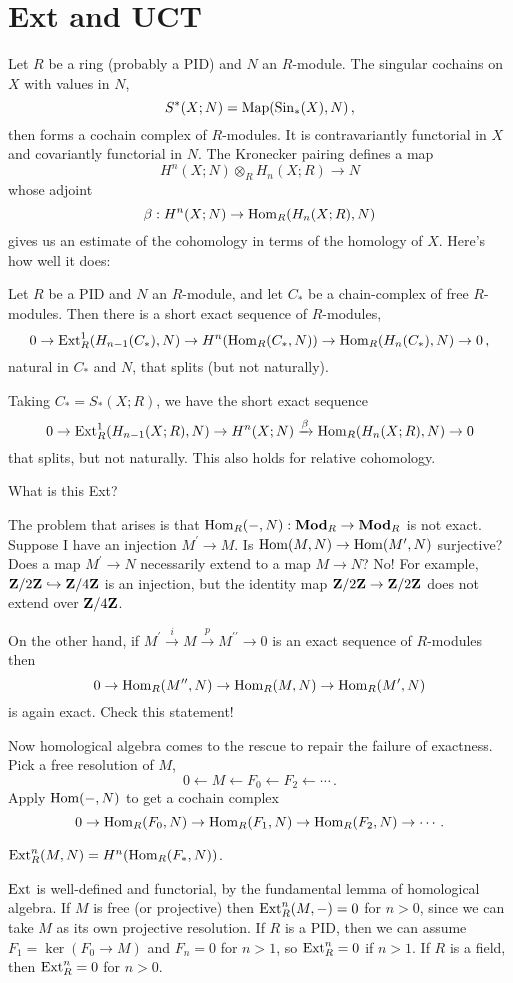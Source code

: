 \section{Ext and UCT}
Let $R$ be a ring (probably a PID) and $N$ an $R$-module. The singular cochains
on $X$ with values in $N$, 
\[S^\ast(X;N)=\operatorname{Map}(\mathrm{Sin}_\ast(X),N)\,,
\]
then forms a cochain complex of $R$-modules. It is contravariantly functorial
in $X$ and covariantly functorial in $N$. The Kronecker pairing defines a map
\[
H^n(X;N)\otimes_R H_n(X;R)\to N
\]
whose adjoint 
\[
\beta:H^n(X;N)\rightarrow\operatorname{Hom}_R( H_n(X;R),N)
\]
gives us an estimate of the cohomology in terms of the homology of $X$. 
Here's how well it does:
\begin{theorem}
\label{thm-mvuct}
Let $R$ be a PID and $N$ an $R$-module, and let $C_*$ 
be a chain-complex of free $R$-modules. Then there is a short exact sequence
of $R$-modules,
\[
0\to\operatorname{Ext}_R^1(H_{n-1}(C_*),N)\to H^n(\operatorname{Hom}_R(C_*,N))\to\operatorname{Hom}_R(H_n(C_*),N)\to0\,,
\]
natural in $C_*$ and $N$, that splits (but not naturally). 
\end{theorem}
Taking $C_*=S_*(X;R)$, we have the short exact sequence
\begin{equation*}
0\to\operatorname{Ext}^1_R( H_{n-1}(X;R),N)\to H^n(X;N)\xrightarrow{\beta}\operatorname{Hom}_R( H_n(X;R),N)\to 0
\end{equation*}
that splits, but not naturally. This also holds for relative cohomology.

What is this Ext?

The problem that arises is that $\operatorname{Hom}_R(-,N):\mathbf{Mod}_R\to\mathbf{Mod}_R$ is not exact. 
Suppose I have an injection $M^\prime\to M$. Is $\operatorname{Hom}(M,N)\to\operatorname{Hom}(M^\prime,N)$ surjective? Does a map $M^\prime\to N$ necessarily extend to a map $M\to N$? No! For example, $\mathbf Z/2\mathbf Z\hookrightarrow\mathbf Z/4\mathbf Z$ is an injection, but the identity
map $\mathbf Z/2\mathbf Z\to\mathbf Z/2\mathbf Z$ does not extend over $\mathbf Z/4\mathbf Z$. 

On the other hand, if $M^\prime\xrightarrow{i} M\xrightarrow{p} M^{\prime\prime}\to 0$ is an exact sequence of $R$-modules then 
\[
0\to \operatorname{Hom}_R(M^{\prime\prime},N)\to\operatorname{Hom}_R(M,N)\to \operatorname{Hom}_R(M^{\prime},N)
\]
is again exact. Check this statement! 

Now homological algebra comes to the rescue to repair the failure of exactness. Pick a free resolution of $M$,
\[
0\leftarrow M\leftarrow F_0\leftarrow F_2\leftarrow\cdots\,.
\]
Apply $\operatorname{Hom}(-,N)$ to get a cochain complex 
\[
0\to \operatorname{Hom}_R(F_0,N)\to \operatorname{Hom}_R(F_1,N)\to \operatorname{Hom}_R(F_2,N)\to\cdots\,.
\]
\begin{definition} 
$\operatorname{Ext}_R^n(M,N)= H^n(\operatorname{Hom}_R(F_\ast,N))$.
\end{definition}
\begin{remark}
$\operatorname{Ext}$ is well-defined and functorial, by the fundamental lemma of homological algebra. If $M$ is free (or projective) then $\operatorname{Ext}_R^n(M,-)=0$ for $n>0$, since we can take $M$ as its own projective resolution. If $R$ is a PID, then we can assume $F_1=\ker(F_0\to M)$ and $F_n=0$ for $n>1$, so $\operatorname{Ext}_R^n=0$ if $n>1$. If $R$ is a field, then $\operatorname{Ext}_R^n=0$ for $n>0$. 
\end{remark}

